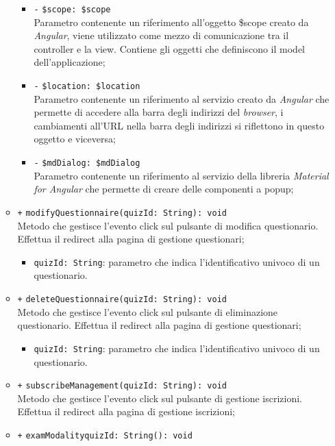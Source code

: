 \begin{itemize}
\begin{itemize}
\begin{itemize}
			\item \texttt{-} \texttt{\$scope: \$scope} \\
			Parametro contenente un riferimento all’oggetto \$scope creato da \textit{Angular}, viene utilizzato come mezzo di comunicazione tra il controller e la view. Contiene gli oggetti che definiscono il model dell’applicazione;
			\item \texttt{-} \texttt{\$location: \$location} \\
		    Parametro contenente un riferimento al servizio creato da \textit{Angular} che permette di accedere alla barra degli indirizzi del \textit{browser}, i cambiamenti all’URL nella barra degli indirizzi si riflettono in questo oggetto e viceversa;
			\item \texttt{-} \texttt{\$mdDialog: \$mdDialog} \\
			Parametro contenente un riferimento al servizio della libreria \textit{Material for Angular} che permette di creare delle componenti a popup;
		\end{itemize}
		\item \texttt{+} \texttt{modifyQuestionnaire(quizId: String): void} \\
		Metodo che gestisce l’evento click sul pulsante di modifica questionario. Effettua il redirect alla pagina di gestione questionari;
		\begin{itemize}
			\item \texttt{quizId: String}: parametro che indica l'identificativo univoco di un questionario.
		\end{itemize}
		\item \texttt{+} \texttt{deleteQuestionnaire(quizId: String): void} \\
		Metodo che gestisce l’evento click sul pulsante di eliminazione questionario. Effettua il redirect alla pagina di gestione questionari;  
		\begin{itemize}
			\item \texttt{quizId: String}: parametro che indica l'identificativo univoco di un questionario.
		\end{itemize}
		\item \texttt{+} \texttt{subscribeManagement(quizId: String): void} \\
		Metodo che gestisce l’evento click sul pulsante di gestione iscrizioni. Effettua il redirect alla pagina di gestione iscrizioni;
		\item \texttt{+} \texttt{examModalityquizId: String(): void} \\

\end{itemize}
\end{itemize}
